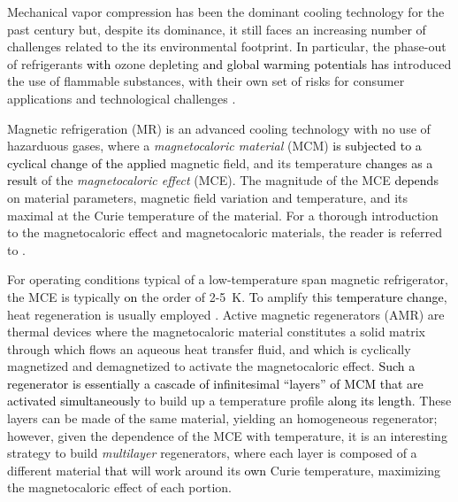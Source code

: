 \documentclass[referee]{svjour3}
\begin{document}
Mechanical vapor compression has been the dominant cooling technology for the past century \cite{bib:nik} but, despite its dominance, it still faces an increasing number of challenges related to the its environmental footprint. In particular, the phase-out of refrigerants \textcolor{black}{with} ozone depleting \textcolor{black}{and global warming potentials has} introduced the use of flammable substances, with their own set of risks for consumer applications \cite{bib:iir-flammable} and technological challenges \cite{bib:lionte18-adapt}.

Magnetic refrigeration (MR) is an advanced cooling technology with no use of hazarduous gases, where a \emph{magnetocaloric material} (MCM) \textcolor{black}{is subjected to a cyclical change of the applied} magnetic field, and its temperature \textcolor{black}{changes as a result} of the \emph{magnetocaloric effect} (MCE). The magnitude of the MCE  \textcolor{black}{depends} on  material parameters, magnetic field variation and temperature, and its maximal at the Curie temperature of the material. For a thorough introduction to the magnetocaloric effect and magnetocaloric materials, the reader is referred to \cite{bib:smith-magneto}.



For operating conditions typical of a low-temperature span magnetic refrigerator, the MCE is typically \textcolor{black}{on} the order of \num{2}-\SI{5}{\kelvin}. \textcolor{black}{T}o amplify this \textcolor{black}{temperature change}, heat regeneration is usually employed \cite{bib:kitanovski}. Active magnetic regenerators (AMR) are thermal devices where the magnetocaloric material constitutes a solid matrix through which flows an aqueous heat transfer fluid, and which is cyclically magnetized and demagnetized to activate the magnetocaloric effect.  \textcolor{black}{Such a regenerator is essentially a cascade of infinitesimal ``layers'' of MCM that are activated simultaneously} to build up a temperature profile \textcolor{black}{along its length}. These layers can be made of the same material, yielding an homogeneous regenerator; however, given the  dependence  of the MCE with temperature, it is an interesting strategy to build \emph{multilayer} regenerators, where each layer is composed of a different material \textcolor{black}{that} will work around its \textcolor{black}{own} Curie temperature, maximizing the magnetocaloric effect of each portion.
\end{document}
